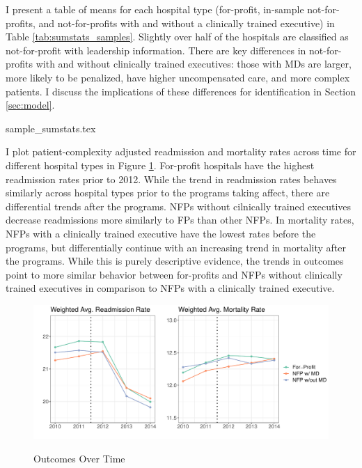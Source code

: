 \documentclass[12pt]{article}
\begin{document}

    I present a table of means for each hospital type (for-profit, in-sample not-for-profits, and not-for-profits with and without a clinically trained executive) in Table \ref{tab:sumstats_samples}. Slightly over half of the hospitals are classified as not-for-profit with leadership information. There are key differences in not-for-profits with and without clinically trained executives: those with MDs are larger, more likely to be penalized, have higher uncompensated care, and more complex patients. I discuss the implications of these differences for identification in Section \ref{sec:model}. 

    {sample_sumstats.tex}

    I plot patient-complexity adjusted readmission and mortality rates across time for different hospital types in Figure \ref{fig:weighted_read_mort_graph}. For-profit hospitals have the highest readmission rates prior to 2012. While the trend in readmission rates behaves similarly across hospital types prior to the programs taking affect, there are differential trends after the programs. NFPs without cilnically trained executives decrease readmissions more similarly to FPs than other NFPs. In mortality rates, NFPs with a clinically trained executive have the lowest rates before the programs, but differentially continue with an increasing trend in mortality after the programs. While this is purely descriptive evidence, the trends in outcomes point to more similar behavior between for-profits and NFPs without clinically trained executives in comparison to NFPs with a clinically trained executive.

    \begin{figure}[ht!]
    \centering
        \caption{Outcomes Over Time}
        \includegraphics[width=\textwidth]{Objects/weighted_read_mort_adjusted_graph.pdf}
        \label{fig:weighted_read_mort_graph}
    \end{figure}
\end{document}
